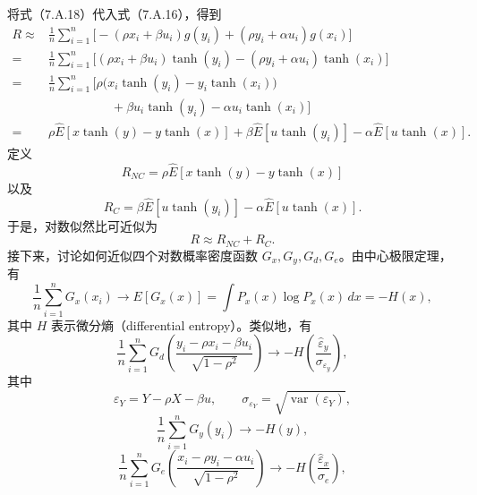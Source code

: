 将式（7.A.18）代入式（7.A.16），得到
\begin{equation}
\begin{aligned}
R\approx{}&\frac1n\sum_{i=1}^n\bigl[-(\rho x_i+\beta u_i)g(y_i)
 +(\rho y_i+\alpha u_i)g(x_i)\bigr]\\
={}&\frac1n\sum_{i=1}^n\bigl[(\rho x_i+\beta u_i)\tanh(y_i)
 -(\rho y_i+\alpha u_i)\tanh(x_i)\bigr]\\
={}&\frac1n\sum_{i=1}^n\bigl[\rho\bigl(x_i\tanh(y_i)-y_i\tanh(x_i)\bigr)\\
&\hspace{5em}{}+\beta u_i\tanh(y_i)-\alpha u_i\tanh(x_i)\bigr]\\
={}&\rho\widehat E[x\tanh(y)-y\tanh(x)]
 +\beta\widehat E[u\tanh(y_i)]-\alpha\widehat E[u\tanh(x)].
\end{aligned}\tag{7.A.19}
\end{equation}
定义
\begin{equation}
R_{NC}=\rho\widehat E[x\tanh(y)-y\tanh(x)]\tag{7.A.20}
\end{equation}
以及
\begin{equation}
R_C=\beta\widehat E[u\tanh(y_i)]-\alpha\widehat E[u\tanh(x)].\tag{7.A.21}
\end{equation}
于是，对数似然比可近似为
\begin{equation}
R\approx R_{NC}+R_C.\tag{7.A.22}
\end{equation}
接下来，讨论如何近似四个对数概率密度函数 $G_x,G_y,G_d,G_e$。由中心极限定理，有
\begin{equation}
\frac1n\sum_{i=1}^nG_x(x_i)\to E[G_x(x)]
 =\int P_x(x)\log P_x(x)\,dx=-H(x),\tag{7.A.23}
\end{equation}
其中 $H$ 表示微分熵（differential entropy）。类似地，有
\begin{equation}
\frac1n\sum_{i=1}^nG_d\left(\frac{y_i-\rho x_i-\beta u_i}{\sqrt{1-\rho^2}}\right)
 \to-H\left(\frac{\widehat\varepsilon_y}{\sigma_{\varepsilon_y}}\right),\tag{7.A.24}
\end{equation}
其中
\[
\varepsilon_Y=Y-\rho X-\beta u,\qquad
\sigma_{\varepsilon_Y}=\sqrt{\operatorname{var}(\varepsilon_Y)},
\]
\begin{equation}
\frac1n\sum_{i=1}^nG_y(y_i)\to-H(y),\tag{7.A.25}
\end{equation}
\begin{equation}
\frac1n\sum_{i=1}^nG_e\left(\frac{x_i-\rho y_i-\alpha u_i}{\sqrt{1-\rho^2}}\right)
 \to-H\left(\frac{\widehat\varepsilon_x}{\sigma_e}\right),\tag{7.A.26}
\end{equation}
